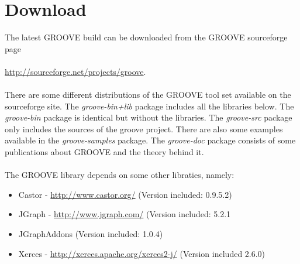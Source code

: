 \section{Download}

The latest GROOVE build can be downloaded from the GROOVE sourceforge page\\
\\
\url{http://sourceforge.net/projects/groove}.\\
\\
There are some different distributions of the GROOVE tool set available on the sourceforge site. The \emph{groove-bin+lib} package includes all the libraries below. The \emph{groove-bin} package is identical but without the libraries. The \emph{groove-src} package only includes the sources of the groove project. There are also some examples available in the \emph{groove-samples} package. The \emph{groove-doc} package consists of some publications about GROOVE and the theory behind it. 
\\\\
The GROOVE library depends on some other libraties, namely:

\begin{itemize}
\item Castor - \url{http://www.castor.org/} (Version included: 0.9.5.2)
\item JGraph - \url{http://www.jgraph.com/} (Version included: 5.2.1 
\item JGraphAddons (Version included: 1.0.4)
\item Xerces - \url{http://xerces.apache.org/xerces2-j/} (Version included 2.6.0)
\end{itemize}





